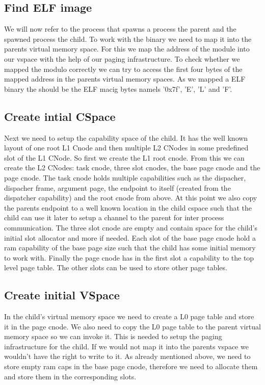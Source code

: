 \subsection{Find ELF image} 

We will now refer to the process that spawns a
process the parent and the spawned process the child.  To work with the binary
we need to map it into the parents virtual memory space. For this we map the
address of the module into our vspace with the help of our paging
infrastructure.  To check whether we mapped the modulo correctly we can try to
access the first four bytes of the mapped address in the parents virtual memory
spaces. As we mapped a ELF binary the should be the ELF macig bytes namels
'0x7f', 'E', 'L' and 'F'.

\subsection{Create intial CSpace} 

Next we need to setup the capability space of
the child. It has the well known layout of one root L1 Cnode and then multiple
L2 CNodes in some predefined slot of the L1 CNode.  So first we create the L1
root cnode. From this we can create the L2 CNodes: task cnode, three slot
cnodes, the base page cnode and the page cnode.  The task cnode holds multiple
capabilities such as the dispacher, dispacher frame, argument page, the endpoint
to itself (created from the dispatcher capability) and the root cnode from
above.  At this point we also copy the parents endpoint to a well known location
in the child cspace such that the child can use it later to setup a channel to
the parent for inter process communication.  The three slot cnode are empty and
contain space for the child's initial slot allocator and more if needed.  Each
slot of the base page cnode hold a ram capability of the base page size such
that the child has some initial memory to work with.  Finally the page cnode has
in the first slot a capability to the top level page table. The other slots can
be used to store other page tables.

\subsection{Create initial VSpace} 

In the child's virtual memory space we need
to create a L0 page table and store it in the page cnode. We also need to copy
the L0 page table to the parent virtual memory space so we can invoke it. This
is needed to setup the paging infrastructure for the child. If we would not map
it into the parents vspace we wouldn't have the right to write to it.  As
already mentioned above, we need to store empty ram caps in the base page cnode,
therefore we need to allocate them and store them in the corresponding slots.


